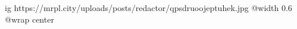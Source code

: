  
 
 
 
 

\ifcmt
  ig https://mrpl.city/uploads/posts/redactor/qpsdruoojeptuhek.jpg
  @width 0.6
	@wrap center
\fi
